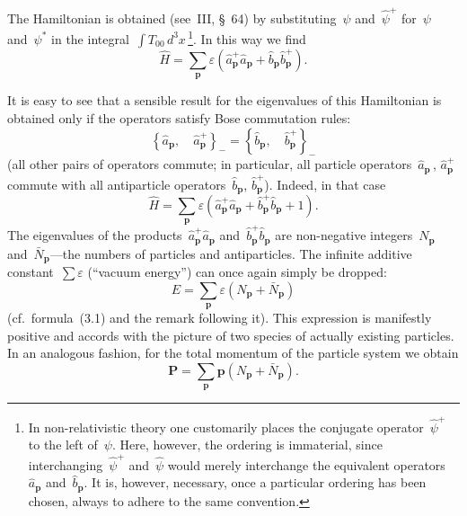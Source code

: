 The Hamiltonian is obtained (see~III, \S~64) by substituting~$\hat{\psi}$ and~$\hat{\psi}^+$ for~$\psi$ and~$\psi^*$ in the integral~$\int T_{00}\,d^3x$\,\footnote{In non-relativistic theory one customarily places the conjugate operator~$\hat{\psi}^+$ to the left of~$\psi$. Here, however, the ordering is immaterial, since interchanging~$\hat{\psi}^+$ and~$\hat{\psi}$ would merely interchange the equivalent operators~$\hat{a}_\mathbf{p}$ and~$\hat{b}_\mathbf{p}$. It is, however, necessary, once a particular ordering has been chosen, always to adhere to the same convention.}. In this way we find
\begin{equation}
\hat{H} = \sum_\mathbf{p} \varepsilon(\hat{a}^+_\mathbf{p}\hat{a}_\mathbf{p} + \hat{b}_\mathbf{p}\hat{b}^+_\mathbf{p}).
\tag{11.3}
\end{equation}

It is easy to see that a sensible result for the eigenvalues of this Hamiltonian is obtained only if the operators satisfy Bose commutation rules:
\begin{equation}
\left\{\hat{a}_\mathbf{p},\quad \hat{a}^+_\mathbf{p}\right\}_- = \left\{\hat{b}_\mathbf{p},\quad \hat{b}^+_\mathbf{p}\right\}_-
\tag{11.4}
\end{equation}
(all other pairs of operators commute; in particular, all particle operators~$\hat{a}_\mathbf{p}$\,, $\hat{a}^+_\mathbf{p}$ commute with all antiparticle operators~$\hat{b}_\mathbf{p}$, $\hat{b}^+_\mathbf{p}$). Indeed, in that case
\[
\hat{H} = \sum_\mathbf{p} \varepsilon(\hat{a}^+_\mathbf{p}\hat{a}_\mathbf{p} + \hat{b}^+_\mathbf{p}\hat{b}_\mathbf{p} + 1).
\]
The eigenvalues of the products~$\hat{a}^+_\mathbf{p}\hat{a}_\mathbf{p}$ and~$\hat{b}^+_\mathbf{p}\hat{b}_\mathbf{p}$ are non-negative integers~$N_\mathbf{p}$ and~$\bar{N}_\mathbf{p}$---the numbers of particles and antiparticles. The infinite additive constant~$\sum\varepsilon$ (``vacuum energy'') can once again simply be dropped:
\begin{equation}
E = \sum_\mathbf{p} \varepsilon(N_\mathbf{p} + \bar{N}_\mathbf{p})
\tag{11.5}
\end{equation}
(cf.\ formula~(3.1) and the remark following it). This expression is manifestly positive and accords with the picture of two species of actually existing particles. In an analogous fashion, for the total momentum of the particle system we obtain
\begin{equation}
\mathbf{P} = \sum_\mathbf{p} \mathbf{p}(N_\mathbf{p} + \bar{N}_\mathbf{p}).
\tag{11.6}
\end{equation}


